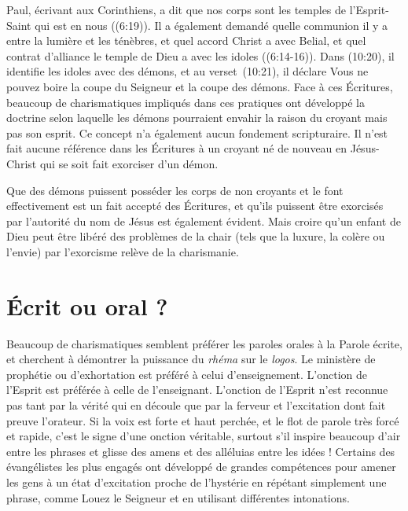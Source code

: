 Paul, écrivant aux Corinthiens, a dit que nos corps sont les temples
 de l'Esprit-Saint qui est en nous ((6:19)).
 Il a également demandé quelle communion il y a entre la lumière
 et les ténèbres, et quel accord Christ a avec Belial,
 et quel contrat d'alliance le temple de Dieu a avec les idoles
 ((6:14-16)). Dans (10:20),
 il identifie les idoles avec des démons, et au verset~(10:21),
 il déclare\frcolon{} \Og Vous ne pouvez boire la coupe du Seigneur
 et la coupe des démons. \Fg{} Face à ces Écritures,
 beaucoup de charismatiques impliqués dans ces pratiques
 ont développé la doctrine selon laquelle les démons pourraient envahir
 la raison du croyant mais pas son esprit.
 Ce concept n'a également aucun fondement scripturaire.
 Il n'est fait aucune référence dans les Écritures à un croyant né de nouveau
 en Jésus-Christ qui se soit fait exorciser d'un démon.

Que des démons puissent posséder les corps de non croyants
 et le font effectivement est un fait accepté des Écritures,
 et qu'ils puissent être exorcisés par l'autorité du nom de Jésus
 est également évident. Mais croire qu'un enfant de Dieu peut être libéré
 des problèmes de la chair (tels que la luxure, la colère ou l'envie)
 par l'exorcisme relève de la charismanie.


\section{\'Ecrit ou oral ?}

Beaucoup de charismatiques semblent préférer les paroles orales
 à la Parole écrite, et cherchent à démontrer la puissance
 du \emph{rhéma} sur le \emph{logos}.
 Le ministère de prophétie ou d'exhortation
 est préféré à celui d'enseignement. L'onction de l'Esprit est préférée
 à celle de l'enseignant. L'onction de l'Esprit n'est reconnue
 pas tant par la vérité qui en découle que par la ferveur
 et l'excitation dont fait preuve l'orateur. Si la voix est forte
 et haut perchée, et le flot de parole très forcé et rapide,
 c'est le signe d'une onction véritable, surtout s'il inspire beaucoup
 d'air entre les phrases et glisse des amens et des alléluias
 entre les idées ! Certains des évangélistes les plus engagés
 ont développé de grandes compétences pour amener les gens
 à un état d'excitation proche de l'hystérie en répétant simplement
 une phrase, comme\frcolon{} \Og Louez le Seigneur \Fg{} et en utilisant différentes
 intonations.

